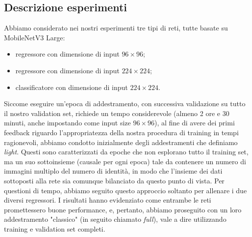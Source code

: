 \begin{comment}
    Descrivere gli esperimenti effettuati e, per ognuno di essi, riportare i risultati sul training e sul validation set in forma tabellare. Analizzare e commentare i risultati nel dettaglio, tirando fuori delle conclusioni motivate dai risultati sperimentali. Eventuali esperimenti aggiuntivi possono essere riportati in questa sezione.
\end{comment}

\subsection{Descrizione esperimenti}

\begin{comment}
    3 esperimenti:
    - regressore 224x244
    - classificatore 224x224
    - regressore 96x96
    Come cosa aggiuntiva, epoche non full che fanno comunque paura
\end{comment}

Abbiamo considerato nei nostri esperimenti tre tipi di reti, tutte basate su MobileNetV3 Large:
\begin{itemize}
    \item regressore con dimensione di input $96 \times 96$;
    \item regressore con dimensione di input $224 \times 224$;
    \item classificatore con dimensione di input $224 \times 224$.
\end{itemize}

Siccome eseguire un'epoca di addestramento, con successiva validazione su tutto il nostro validation set, richiede un tempo considerevole (almeno 2 ore e 30 minuti, anche impostando come input size $96 \times 96$), al fine di avere dei primi feedback riguardo l'appropriatezza della nostra procedura di training in tempi ragionevoli, abbiamo condotto inizialmente degli addestramenti che definiamo \emph{light}. Questi sono caratterizzati da epoche che non esplorano tutto il training set, ma un suo sottoinsieme (causale per ogni epoca) tale da contenere un numero di immagini multiplo del numero di identità, in modo che l'insieme dei dati sottoposti alla rete sia comunque bilanciato da questo punto di vista.
Per questioni di tempo, abbiamo seguito questo approccio soltanto per allenare i due diversi regressori. I risultati hanno evidenziato come entrambe le reti promettessero buone performance, e, pertanto, abbiamo proseguito con un loro addestramento "classico" (in seguito chiamato \emph{full}), vale a dire utilizzando training e validation set completi.

